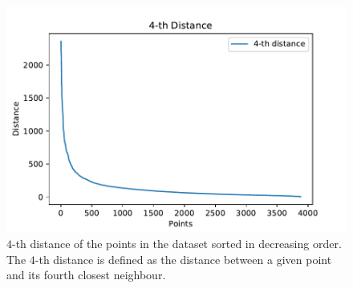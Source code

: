 \documentclass[a4paper]{article}
\begin{document}
	\begin{figure}
		\includegraphics[width=\linewidth]{k_dist_dbscan.pdf}
		\caption{$4$-th distance of the points in the dataset sorted in decreasing order. The $4$-th distance is defined as the distance between a given point and its fourth closest neighbour.}
		\label{fig:dbscan_distance}
	\end{figure}
\end{document}

